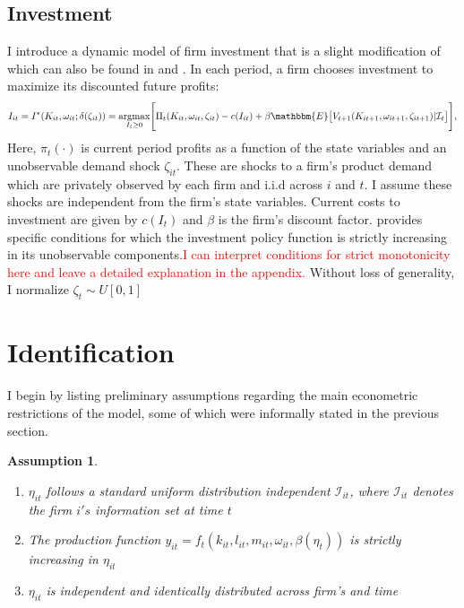 \documentclass{article}
\newtheorem{assump}{Assumption}[section]
\begin{document}
\subsection*{Investment} \label{investment}
I introduce a dynamic model of firm investment that is a slight modification of \cite{Ericson1995} which can also be found in \cite{Hu2013} and \cite{Ackerberg2007}. In each period, a firm chooses investment to maximize its discounted future profits:
\begin{equation} \label{valuefn}
I_{it}=I^{*}(K_{it}, \omega_{it}; \delta(\zeta_{it}))=\underset{I_{t}\geq 0}{\operatorname{argmax}}\Bigg[\Pi_{t}(K_{it}, \omega_{it}, \zeta_{it})-c(I_{it})+\beta\mathbbm{E}\big[V_{t+1}(K_{it+1}, \omega_{it+1}, \zeta_{it+1})|\mathcal{I}_{t}\big]\Bigg],
\end{equation}
Here, $\pi_{t}(\cdot)$ is current period profits as a function of the state variables and an unobservable demand shock $\zeta_{it}$. These are shocks to a firm's product demand which are privately observed by each firm and i.i.d across $i$ and $t$. I assume these shocks are independent from the firm's state variables. Current costs to investment are given by $c(I_{t})$ and $\beta$ is the firm's discount factor. \cite{Pakesa} provides specific conditions for which the investment policy function is strictly increasing in its unobservable components.\textcolor{red}{I can interpret conditions for strict monotonicity here and leave a detailed explanation in the appendix.} Without loss of generality, I normalize $\zeta_{t}\sim U[0,1]$


\section{Identification}

I begin by listing preliminary assumptions regarding the main econometric restrictions of the model, some of which were informally stated in the previous section.

\begin{assump} \label{pfmomentassume}
~
\begin{enumerate}[label=(\roman*)]
    \item $\eta_{it}$ follows a standard uniform distribution independent $\mathcal{I}_{it}$, where $\mathcal{I}_{it}$ denotes the firm $i's$ information set at time $t$
    \item The production function $y_{it}=f_{t}(k_{it}, l_{it}, m_{it}, \omega_{it}, \beta(\eta_{t}))$ is strictly increasing in $\eta_{it}$
    \item $\eta_{it}$ is independent and identically distributed across firm's and time
    \end{enumerate}
\end{assump}
\end{document}
